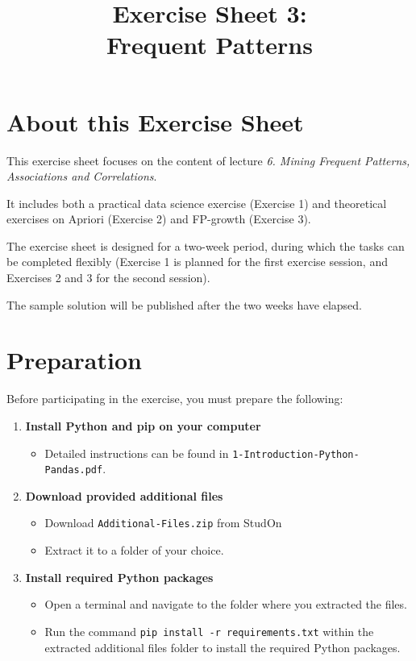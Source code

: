 \documentclass[
english,
smallborders
]{i6prcsht}
\begin{document}
\title{Exercise Sheet 3: \\ Frequent Patterns}
\maketitle
\vspace*{-2cm}

\section*{About this Exercise Sheet}

This exercise sheet focuses on the content of lecture \textit{6. Mining Frequent Patterns, Associations and Correlations}.

It includes both a practical data science exercise (Exercise 1) and theoretical exercises on Apriori (Exercise 2) and FP-growth (Exercise 3).

The exercise sheet is designed for a two-week period, during which the tasks can be completed flexibly (Exercise 1 is planned for the first exercise session, and Exercises 2 and 3 for the second session).

The sample solution will be published after the two weeks have elapsed.

\section*{Preparation}

Before participating in the exercise, you must prepare the following:

\begin{enumerate}
	\item \textbf{Install Python and pip on your computer}

	      \begin{itemize}
		      \item Detailed instructions can be found in \texttt{1-Introduction-Python-Pandas.pdf}.
	      \end{itemize}

	\item \textbf{Download provided additional files}

	      \begin{itemize}
		      \item Download \texttt{Additional-Files.zip} from StudOn
		      \item Extract it to a folder of your choice.
	      \end{itemize}

	\item \textbf{Install required Python packages}

	      \begin{itemize}
		      \item Open a terminal and navigate to the folder where you extracted the files.
		      \item Run the command \texttt{pip install -r requirements.txt} within the extracted additional files folder to install the required Python packages.
	      \end{itemize}


\end{enumerate}
\end{document}
